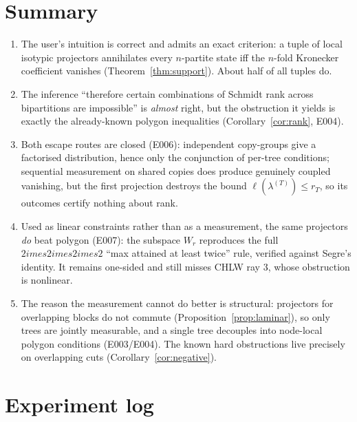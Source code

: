 \documentclass[11pt]{article}
\theoremstyle{definition}
\theoremstyle{remark}
\begin{document}
\section{Summary}

\begin{enumerate}
  \item The user's intuition is correct and admits an exact criterion: a tuple of local
    isotypic projectors annihilates every $n$-partite state iff the $n$-fold Kronecker
    coefficient vanishes (Theorem~\ref{thm:support}). About half of all tuples do.
  \item The inference ``therefore certain combinations of Schmidt rank across
    bipartitions are impossible'' is \emph{almost} right, but the obstruction it yields
    is exactly the already-known polygon inequalities (Corollary~\ref{cor:rank}, E004).
  \item Both escape routes are closed (E006): independent copy-groups give a factorised
    distribution, hence only the conjunction of per-tree conditions; sequential
    measurement on shared copies does produce genuinely coupled vanishing, but the first
    projection destroys the bound $\ell(\lambda^{(T)}) \le r_T$, so its outcomes certify
    nothing about rank.
  \item Used as linear constraints rather than as a measurement, the same projectors
    \emph{do} beat polygon (E007): the subspace $W_r$ reproduces the full
    $2	imes2	imes2	imes2$ ``max attained at least twice'' rule, verified against
    Segre's identity. It remains one-sided and still misses CHLW ray 3, whose
    obstruction is nonlinear.
  \item The reason the measurement cannot do better is structural: projectors for overlapping blocks
    do not commute (Proposition~\ref{prop:laminar}), so only trees are jointly
    measurable, and a single tree decouples into node-local polygon conditions
    (E003/E004). The known hard obstructions live precisely on overlapping cuts
    (Corollary~\ref{cor:negative}).
\end{enumerate}

\section*{Experiment log}
\end{document}

